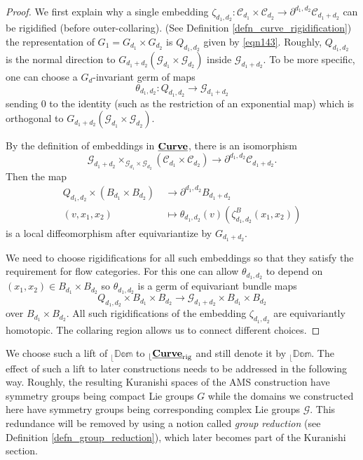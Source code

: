 \documentclass[reqno, 10pt]{amsart}
\numberwithin{equation}{section}
\numberwithin{equation}{section}
\theoremstyle{definition}
\theoremstyle{remark}
\newcommand{\beqn}{\begin{equation*}}
\newcommand{\eeqn}{\end{equation*}}
\newcommand{\mb}{\mathbb}
\newcommand{\mc}{\mathcal}
\renewcommand{\outer}{{}_{\lfloor}}
\newcommand{\uds}[1]{\underline{\smash{#1}}}
\begin{document}
\begin{proof}
We first explain why a single embedding $\zeta_{d_1, d_2}: {\mc C}_{d_1} \times {\mc C}_{d_2} \to \partial^{d_1, d_2} {\mc C}_{d_1 + d_2}$ can be rigidified (before outer-collaring). (See Definition \ref{defn_curve_rigidification}) the representation of $G_1 = G_{d_1}\times G_{d_2}$ is $Q_{d_1, d_2}$ given by \eqref{eqn143}. Roughly, $Q_{d_1, d_2}$ is the normal direction to $G_{d_1 + d_2}( {\mc G}_{d_1} \times {\mc G}_{d_2})$ inside ${\mc G}_{d_1 + d_2}$. To be more specific, one can choose a $G_d$-invariant germ of maps
\beqn
\theta_{d_1, d_2}: Q_{d_1, d_2} \to {\mc G}_{d_1 + d_2}
\eeqn
sending $0$ to the identity (such as the restriction of an exponential map) which is orthogonal to $G_{d_1+d_2}( {\mc G}_{d_1} \times {\mc G}_{d_2})$. 

By the definition of embeddings in $\uds{\bf Curve}$, there is an isomorphism
\beqn
{\mc G}_{d_1+d_2} \times_{{\mc G}_{d_1} \times {\mc G}_{d_2}} ({\mc C}_{d_1}\times {\mc C}_{d_2} ) \to \partial^{d_1, d_2} {\mc C}_{d_1 + d_2}.
\eeqn
Then the map 
\beqn
\begin{split}
Q_{d_1, d_2} \times (B_{d_1} \times B_{d_2}) &\ \to \partial^{d_1, d_2} B_{d_1 + d_2}\\
(v, x_1, x_2) & \ \mapsto \theta_{d_1, d_2}(v) (\zeta_{d_1, d_2}^B (x_1, x_2))
\end{split}
\eeqn
is a local diffeomorphism after equivariantize by $G_{d_1 + d_2}$.

We need to choose rigidifications for all such embeddings so that they satisfy the requirement for flow categories. For this one can allow $\theta_{d_1, d_2}$ to depend on $(x_1, x_2) \in B_{d_1} \times B_{d_2}$ so $\theta_{d_1, d_2}$ is a germ of equivariant bundle maps
\beqn
Q_{d_1, d_2} \times B_{d_1} \times B_{d_2} \to {\mc G}_{d_1 + d_2} \times B_{d_1} \times B_{d_2}
\eeqn
over $B_{d_1} \times B_{d_2}$. All such rigidifications of the embedding $\zeta_{d_1, d_2}$ are equivariantly homotopic. The collaring region allows us to connect different choices.
\end{proof}

We choose such a lift of $\outer \mb{Dom}$ to $\outer \uds{\bf Curve}_{\rm rig}$ and still denote it by $\outer \mb{Dom}$. The effect of such a lift to later constructions needs to be addressed in the following way. Roughly, the resulting Kuranishi spaces of the AMS construction have symmetry groups being compact Lie groups $G$ while the domains we constructed here have symmetry groups being corresponding complex Lie groups ${\mc G}$. This redundance will be removed by using a notion called {\it group reduction} (see Definition \ref{defn_group_reduction}), which later becomes part of the Kuranishi section. 
\end{document}
